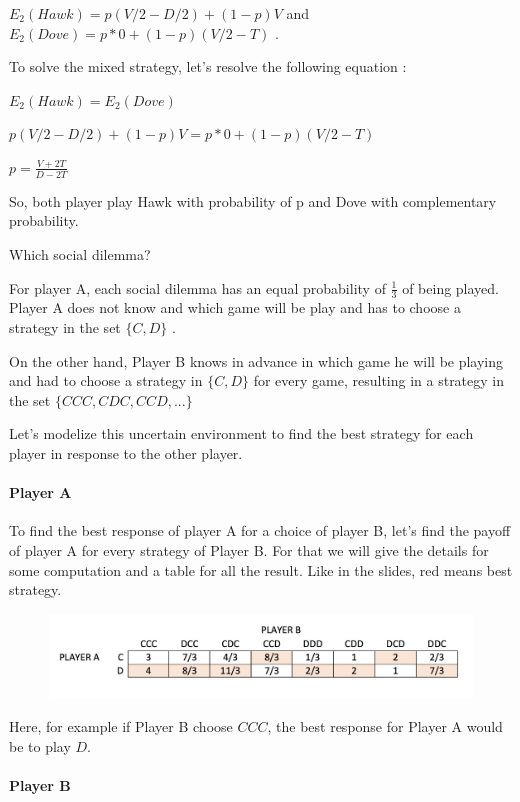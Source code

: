 \documentclass[11pt]{article}
\newenvironment{exercise}[2][Exercise]{\begin{trivlist}
\item[\hskip \labelsep {\bfseries #1}\hskip \labelsep {\bfseries #2.}]}{\end{trivlist}}
\begin{document}
$E_2 (Hawk) = p (V/2-D/2) + (1-p) V$ and $E_2 (Dove) = p * 0 + (1-p)(V/2-T)$ .

To solve the mixed strategy, let's resolve the following equation : 

$E_2 (Hawk) = E_2 (Dove)$

$p (V/2-D/2) + (1-p) V = p * 0 + (1-p)(V/2-T)$

$ p = \frac{V+2T}{D-2T}$

So, both player play Hawk with probability of p and Dove with complementary probability. %

\begin{exercise}{2} Which social dilemma?
\end{exercise}

For player A, each social dilemma has an equal probability of $\frac{1}{3}$ of being played. Player A does not know and which game will be play and has to choose a strategy in the set $\{C, D \}$ . 

On the other hand, Player B knows in advance in which game he will be playing and had to choose a strategy in $\{C, D \}$ for every game, resulting in a strategy in the set $\{ CCC, CDC, CCD, ... \} $

Let's modelize this uncertain environment to find the best strategy for each player in response to the other player.

\paragraph{Player A}

To find the best response of player A for a choice of player B, let's find the payoff of player A for every strategy of Player B. For that we will give the details for some computation and a table for all the result. Like in the slides, red means best strategy.


\begin{figure}[H]
   \includegraphics[width=\textwidth]{img/exo2-table1.png}
\end{figure}

Here, for example if Player B choose $CCC$, the best response for Player A would be to play $D$.


\paragraph{Player B}
\end{document}
